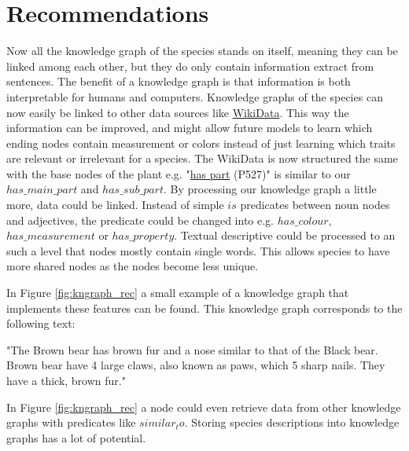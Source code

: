 \documentclass[a4paper, 12pt, oneside]{book} %
\begin{document}
\newpage
\section{Recommendations}



Now all the knowledge graph of the species stands on itself, meaning they can be linked among each other, but they do only contain information extract from sentences.
The benefit of a knowledge graph is that information is both interpretable for humans and computers.
Knowledge graphs of the species can now easily be linked to other data sources like \href{https://www.wikidata.org/wiki/Wikidata:Main_Page}{WikiData}.
This way the information can be improved, and might allow future models to learn which ending nodes contain measurement or colors instead of just learning which traits are relevant or irrelevant for a species.
The WikiData is now structured the same with the base nodes of the plant e.g. "\href{https://www.wikidata.org/wiki/Property:P527}{has part} (P527)"  is similar to our $has\_main\_part$ and $has\_sub\_part$.
By processing our knowledge graph a little more, data could be linked.
Instead of simple $is$ predicates between noun nodes and adjectives, the predicate could be changed into e.g. $has\_colour$, $has\_measurement$ or $has\_property$.
Textual descriptive could be processed to an such a level that nodes mostly contain single words.
This allows species to have more shared nodes as the nodes become less unique.

In Figure \ref{fig:kngraph_rec} a small example of a knowledge graph that implements these features can be found.
This knowledge graph corresponds to the following text:
\newline

\noindent
"The Brown bear has brown fur and a nose similar to that of the Black bear. Brown bear have 4 large claws, also known as paws, which 5 sharp nails. They have a thick, brown fur."
\newline

\noindent
In Figure \ref{fig:kngraph_rec} a node could even retrieve data from other knowledge graphs with predicates like $similar_to$.
Storing species descriptions into knowledge graphs has a lot of potential.
\end{document}
